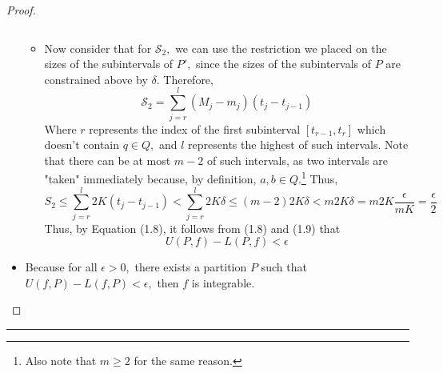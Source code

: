\documentclass[openany, amssymb, psamsfonts]{amsart}
\theoremstyle{definition}
\numberwithin{equation}{section}
\begin{document}
\begin{proof}
\begin{itemize}
\begin{itemize}
\begin{equation}
\end{equation}
\item Now consider that for $\mathcal{S}_2,$ we can use the restriction we placed on the sizes of the subintervals of $P',$ since the sizes of the subintervals of $P$ are constrained above by $\delta.$ Therefore, \[\mathcal{S}_2 = \sum_{j=r}^l(M_j-m_j)(t_j - t_{j-1})\] Where $r$ represents the index of the first subinterval $[t_{r-1}, t_{r}]$ which doesn't contain $q\in Q,$ and $l$ represents the highest of such intervals. Note that there can be at most $m-2$ of such intervals, as two intervals are "taken" immediately because, by definition, $a,b \in Q.$\footnote{Also note that $m\geq 2$ for the same reason.} Thus, \begin{equation}
S_2 \leq \sum_{j=r}^l2K(t_j - t_{j-1})< \sum_{j=r}^l2K\delta \leq (m-2)2K\delta <m2K\delta = m2K\frac{\epsilon}{mK} = \frac{\epsilon}{2}
\end{equation}
Thus, by Equation (1.8), it follows from (1.8) and (1.9) that \[U(P,f) - L(P,f)< \epsilon\]
\end{itemize}

\item Because for all $\epsilon>0,$ there exists a partition $P$ such that $U(f,P) - L(f,P)< \epsilon,$ then $f$ is integrable. 
\end{itemize}

\end{proof}\vspace{4pt}     \hrule   \vspace{4pt}

\newpage
\end{document}
